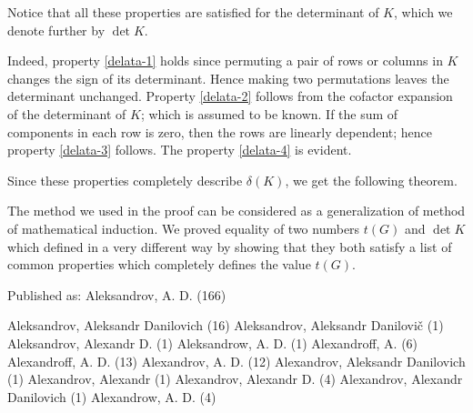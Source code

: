 Notice that all these properties are satisfied for the determinant of $K$, which we denote further by $\det K$.

Indeed, property \ref{delata-1} holds since permuting a pair of rows or columns in $K$ changes the sign of its determinant.
Hence making two permutations leaves the determinant unchanged.
Property \ref{delata-2} follows from the cofactor expansion of the determinant of $K$;
which is assumed to be known. 
If the sum of components in each row is zero, then the rows are linearly dependent;
hence property \ref{delata-3} follows.
The property \ref{delata-4} is evident.

Since these properties completely describe $\delta(K)$, we get the following theorem.



The method we used in the proof can be considered as a generalization of method of mathematical induction.
We proved equality of two numbers $t(G)$ and $\det K$ which defined in a very different way by showing that they both satisfy a list of common properties which completely defines the value $t(G)$.











Published as: Aleksandrov, A. D. (166)

     Aleksandrov, Aleksandr Danilovich (16)
     Aleksandrov, Aleksandr Danilovič (1)
     Aleksandrov, Alexandr D. (1)
     Aleksandrow, A. D. (1)
     Alexandroff, A. (6)
     Alexandroff, A. D. (13)
     Alexandrov, A. D. (12)
     Alexandrov, Aleksandr Danilovich (1)
     Alexandrov, Alexandr (1)
     Alexandrov, Alexandr D. (4)
     Alexandrov, Alexandr Danilovich (1)
     Alexandrow, A. D. (4)

